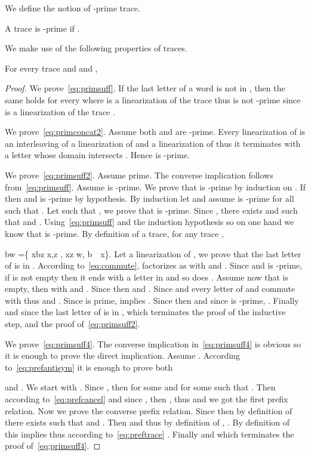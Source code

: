 \documentclass[a4paper,UKenglish]{lipics-v2016}
\newcommand{\ind}{~\mathbb{I}~}
\newcommand{\be}{}
\begin{document}
We define the notion of -prime trace.
\begin{definition}
A trace is -prime if .
\end{definition}

We make use of the following properties of traces.

\begin{lemma}\label{lem:props}
For every trace  and  and ,

\end{lemma}
\begin{proof}
We prove~\eqref{eq:primsuff}.
If the last letter of a word 
is not in , then the same holds for every  where  is a linearization of the trace  thus  is not -prime since  is a linearization of the trace .


We prove~\eqref{eq:primconcat2}.
Assume both  and  are -prime.
Every linearization of  is an interleaving of a linearization
of  and a linearization of  thus it terminates with a letter
whose domain intersects . Hence  is -prime.

We prove~\eqref{eq:primsuff2}.
Assume  prime.
The converse implication follows from~\eqref{eq:primsuff}.
Assume  is -prime.
We prove that  is -prime by induction on .
If  then  and  is -prime by hypothesis.
By induction let  and assume  is -prime
for all  such that . Let  such that ,
we prove that  is -prime.
Since ,
there exists  and 
such that  and .
Using~\eqref{eq:primsuff} and the induction hypothesis
so on one hand we know that  is -prime.
By definition of a trace, for any trace ,
\be
\label{eq:commute}
bw =\{ xbz \mid x,z , xz \in w, b\ind x\}\enspace.
\ee
Let  a linearization of ,
we prove that the last letter of  is in .
According to~\eqref{eq:commute},
 factorizes as  with  and .
Since  and  is -prime,
if  is not empty then it ends with a letter in  and so does .
Assume now that  is empty, then  with  and .
Since  then 
and .
Since 
and  every letter of  and  commute with 
thus  and .
Since  is prime,  implies .
Since  then  and since  is -prime, .
Finally  and since  the last letter of  is in ,
which terminates the proof of the inductive step,
and the proof of~\eqref{eq:primsuff2}.





We prove~\eqref{eq:primsuff4}.
The converse implication in~\eqref{eq:primsuff4} is obvious so it is enough 
to prove the direct implication.
Assume .
According to~\eqref{eq:prefantisym}
it is enough to prove
both

and
.
We start with .
Since , then  for some 
and  for some  such that .
Then  according to~\eqref{eq:prefcancel}
and since , then ,
thus  and we got the first prefix relation.
Now we prove the converse prefix relation.
Since  then by definition of  there exists 
such that  and .
Then  and 
thus by definition of ,
.
By definition of  this implies
 thus according to~\eqref{eq:preftrace}
. Finally 
and 
which terminates the proof of~\eqref{eq:primsuff4}.






\end{proof}
\end{document}

